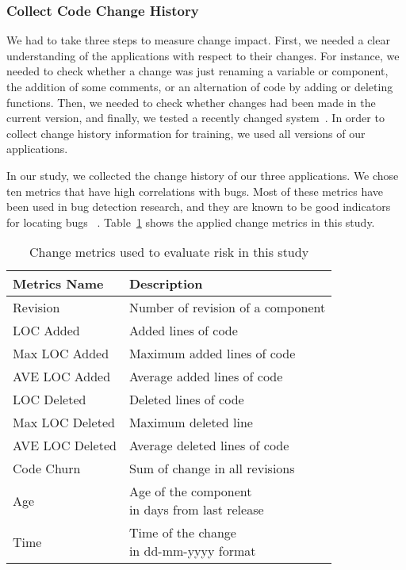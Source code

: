 \subsubsection{Collect Code Change History}
We had to take three steps to measure change impact. 
First, we needed a clear understanding of the applications with respect to their changes.
For instance, we needed to check whether a change 
was just renaming a variable or component, the addition of some comments, 
or an alternation of code by adding or deleting functions. 
Then, we needed to check whether changes had been made in the current version, 
and finally, we tested a recently changed system~\cite{change3}. 
In order to collect change history information for training, 
we used all versions of our applications.

In our study, we collected the change history of our three applications. 
We chose ten metrics that have high correlations with bugs.
Most of these metrics have been used in bug detection research, and they
are known to be good indicators for locating bugs 
~\cite{sungmicro, shihab12, raimund, change1, change2}. 
Table~\ref{tab:historyMetrics} shows the applied change metrics in this study. \\

\begin{table}[!ht]
	\caption{Change metrics used to evaluate risk in this study}	
	\vspace*{3pt}
	\begin{tabular} {|l|l|} \hline
		\textbf{Metrics Name} & \textbf{Description} \\\hline \hline
		Revision & Number of revision of a component  \\\hline
		LOC Added&   Added lines of code \\\hline
		Max LOC Added  & Maximum added lines of code \\\hline
		AVE LOC Added  & Average added lines of code \\\hline
		LOC Deleted  & Deleted lines of code  \\\hline
		Max LOC Deleted & Maximum deleted line\\\hline
		AVE LOC Deleted & Average deleted lines of code \\\hline
		Code Churn & Sum of change in all revisions \\\hline
		Age & \parbox[t]{5cm}{Age of the component \\ in days from last release} \\\hline
		Time & \parbox[t]{5cm} {Time of the change \\ in dd-mm-yyyy format} \\\hline		
	\end{tabular}
	\label{tab:historyMetrics}
\end{table}

